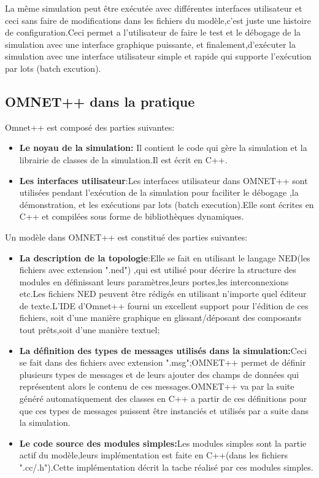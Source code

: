 La même simulation peut être exécutée avec différentes interfaces utilisateur et ceci  sans faire de modifications dans les fichiers du modèle,c'est juste une histoire de configuration.Ceci  permet  a l'utilisateur de faire le test et le débogage de la simulation avec  une interface graphique puissante, et finalement,d'exécuter la simulation avec une interface  utilisateur simple et rapide qui supporte l'exécution  par lots (batch excution).

\subsection{OMNET++ dans la pratique}

Omnet++ est composé des parties suivantes:

\begin{itemize}
\item \textbf{ Le noyau de la simulation:} Il contient le code qui gère la simulation et la librairie de classes de la simulation.Il est écrit en C++.
\item \textbf{ Les interfaces utilisateur}:Les interfaces utilisateur dans OMNET++ sont utilisées pendant l'exécution de la simulation pour faciliter le débogage  ,la démonstration, et les exécutions par lots (batch execution).Elle sont écrites en C++ et compilées sous forme de bibliothèques dynamiques.	
\end{itemize}

Un modèle dans OMNET++ est constitué des parties suivantes:
\begin{itemize}
	\item \textbf{La description de la topologie}:Elle se fait en utilisant le langage NED(les fichiers avec extension ".ned") ,qui est utilisé pour décrire la structure des modules en définissant leurs paramètres,leurs portes,les interconnexions etc.Les fichiers NED peuvent être rédigés en utilisant n'importe quel éditeur de texte.L'IDE d'Omnet++ fourni un excellent support pour l'édition de ces fichiers, soit d'une manière graphique en glissant/déposant des composants tout prêts,soit d'une manière textuel;
	\item\textbf{ La définition des types de messages utilisés dans la simulation:}Ceci se fait dans des fichiers avec extension ".msg";OMNET++ permet de définir plusieurs types de messages  et de leurs ajouter des champs de données qui représentent alors le contenu de ces messages.OMNET++ va par la suite généré automatiquement des classes en C++ a partir de ces définitions pour que ces types de messages puissent être instanciés et utilisés par a suite dans la simulation.
	\item \textbf{Le code source des modules simples:}Les modules simples sont la partie actif du modèle,leurs implémentation est faite en C++(dans les fichiers ".cc/.h").Cette implémentation décrit la tache réalisé par ces modules simples.
\end{itemize}	

